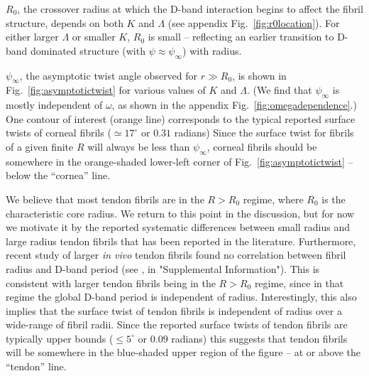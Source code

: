 \documentclass[twoside,twocolumn,9pt]{article}
\begin{document}
$R_0$, the crossover radius at which the D-band interaction begins to affect the fibril structure, depends on both $K$ and $\Lambda$ (see appendix Fig.~\ref{fig:r0location}). For either larger $\Lambda$ or smaller $K$, $R_0$ is small -- reflecting an earlier transition to D-band dominated structure (with $\psi \approx \psi_\infty$) with radius. 

$\psi_\infty$, the asymptotic twist angle observed for  $r \gg R_0$, is shown in Fig.~\ref{fig:asymptotictwist} for various values of $K$ and $\Lambda$. (We find that $\psi_\infty$ is mostly independent of $\omega$, as shown in the appendix Fig.~\ref{fig:omegadependence}.) One contour of interest (orange line) corresponds to the typical reported surface twists of corneal fibrils ($\simeq 17^\circ$ or $0.31$ radians)\cite{Yamamoto:2000, Holmes:2001, Hirsch:2001, Raspanti:2018}  Since the surface twist for fibrils of a given finite $R$ will always be less than $\psi_\infty$, corneal fibrils should be somewhere in the orange-shaded lower-left corner of Fig.~\ref{fig:asymptotictwist} -- below the ``cornea'' line.

We believe that most tendon fibrils are in the $R > R_0$ regime, where $R_0$ is the characteristic core radius. We return to this point in the discussion, but for now we motivate it by the reported systematic differences between small radius and large radius tendon fibrils that has been reported in the literature.\cite{Yamamoto:1997, Quigley:2018} Furthermore, recent study of larger \textit{in vivo} tendon fibrils found no correlation between fibril radius and D-band period (see \cite{Baldwin:2020}, in "Supplemental Information"). This is consistent with larger tendon fibrils being in the $R > R_0$ regime, since in that regime the global D-band period is independent of radius. Interestingly, this also implies that the surface twist of tendon fibrils is independent of radius over a wide-range of fibril radii. Since the reported surface twists of tendon fibrils are typically upper bounds ($\leq 5^\circ$ or $0.09$ radians)\cite{Baselt:1993, Hulmes:1995, Raspanti:2018} this suggests that tendon fibrils will be somewhere in the blue-shaded upper region of the figure -- at or above the ``tendon'' line.    
\end{document}
